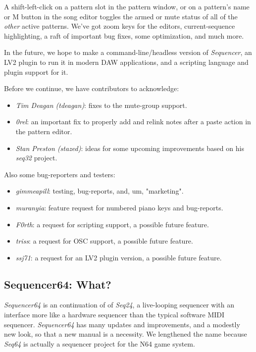 \documentclass[
 11pt,
 twoside,
 a4paper,
 headinclude,
 footinclude,
 final                                 %
]{article}
\begin{document}
   A shift-left-click on a pattern slot in the pattern window,
   or on a pattern's name or M button in the song editor toggles the armed or
   mute status of all of the \textsl{other} active patterns.
   We've got zoom keys for the editors, current-sequence highlighting,
   a raft of important bug fixes, some optimization, and much more.

   In the future, we hope to make a command-line/headless version of
   \textsl{Sequencer}, an LV2 plugin to run it in modern DAW applications,
   and a scripting language and plugin support for it.

   Before we continue, we have contributors to acknowledge:

   \begin{itemize}
      \item \textsl{Tim Deagan (tdeagan)}:
         fixes to the mute-group support.
      \item \textsl{0rel}:
         an important fix to properly add and relink notes after a
         paste action in the pattern editor.
      \item \textsl{Stan Preston (stazed)}:
         ideas for some upcoming improvements based
         on his \textsl{seq32} project.
   \end{itemize}

   Also some bug-reporters and testers:

   \begin{itemize}
      \item \textsl{gimmeapill}:
         testing, bug-reports, and, um, "marketing".
      \item \textsl{muranyia}:
         feature request for numbered piano keys and bug-reports.
      \item \textsl{F0rth}:
         a request for scripting support, a possible future feature.
      \item \textsl{triss}:
         a request for OSC support, a possible future feature.
      \item \textsl{ssj71}:
         a request for an LV2 plugin version, a possible future feature.
   \end{itemize}

\subsection{Sequencer64: What?}
\label{subsec:what_is_sequencer64}

   \textsl{Sequencer64} is an continuation of of \textsl{Seq24},
   a live-looping sequencer with an interface more like a hardware sequencer
   than the typical software MIDI sequencer.
   \textsl{Sequencer64} has many updates and improvements, and a modestly
   new look, so that a new manual is a necessity.
   We lengthened the name because \textsl{Seq64} is actually a sequencer
   project for the N64 game system.
\end{document}
